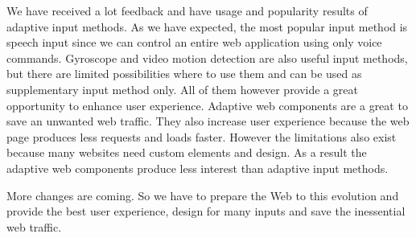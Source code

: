 \documentclass{iitsrc}
\begin{document}

We have received a lot feedback and have usage and popularity results of adaptive input methods. As we have expected, the most popular input method is speech input since we can control an entire web application using only voice commands. Gyroscope and video motion detection are also useful input methods, but there are limited possibilities where to use them and can be used as supplementary input method only. All of them however provide a great opportunity to enhance user experience. Adaptive web components are a great to save an unwanted web traffic. They also increase user experience because the web page produces less requests and loads faster. However the limitations also exist because many websites need custom elements and design. As a result the adaptive web components produce less interest than adaptive input methods.

More changes are coming. So we have to prepare the Web to this evolution and provide the best user experience, design for many inputs and save the inessential web traffic.



\end{document}
